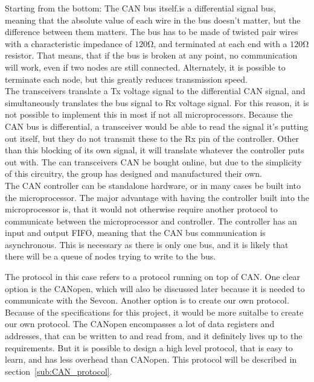 Starting from the bottom: The CAN bus itself.is a differential signal bus, meaning that the absolute value of each wire in the bus doesn't matter, but the difference between them matters. 
The bus has to be made of twisted pair wires with a characteristic impedance of $\si{120 \ohm}$, and terminated at each end with a $\si{120 \ohm}$ resistor.
That means, that if the bus is broken at any point, no communication will work, even if two nodes are still connected.
Alternately, it is possible to terminate each node, but this greatly reduces transmission speed.\\

The transceivers translate a Tx voltage signal to the differential CAN signal, and simultaneously translates the bus signal to Rx voltage signal. 
For this reason, it is not possible to implement this in most if not all microprocessors.
Because the CAN bus is differential, a transceiver would be able to read the signal it's putting out itself, but they do not transmit these to the Rx pin of the controller.
Other than this blocking of its own signal, it will translate whatever the controller puts out with.
The can transceivers CAN be bought online, but due to the simplicity of this circuitry, the group has designed and manufactured their own.\\

The CAN controller can be standalone hardware, or in many cases be built into the microprocessor.
The major advantage with having the controller built into the microprocessor is, that it would not otherwise require another protocol to communicate between the microprocessor and controller. 
The controller has an input and output FIFO, meaning that the CAN bus communication is asynchronous. 
This is necessary as there is only one bus, and it is likely that there will be a queue of nodes trying to write to the bus.

The protocol in this case refers to a protocol running on top of CAN.
One clear option is the CANopen, which will also be discussed later because it is needed to communicate with the Sevcon. 
Another option is to create our own protocol. 
Because of the specifications for this project, it would be more suitalbe to create our own protocol.
The CANopen encompasses a lot of data registers and addresses, that can be written to and read from, and it definitely lives up to the requirements.
But it is possible to design a high level protocol, that is easy to learn, and has less overhead than CANopen.
This protocol will be described in section~\ref{sub:CAN_protocol}.\\

